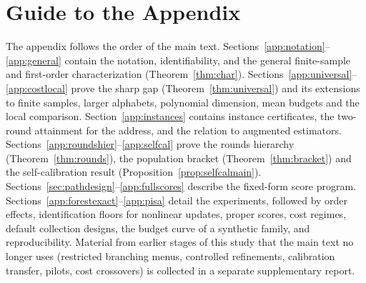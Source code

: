 \section*{Guide to the Appendix}
The appendix follows the order of the main text. Sections~\ref{app:notation}--\ref{app:general} contain the notation, identifiability, and the general finite-sample and first-order characterization (Theorem~\ref{thm:char}). Sections~\ref{app:universal}--\ref{app:costlocal} prove the sharp gap (Theorem~\ref{thm:universal}) and its extensions to finite samples, larger alphabets, polynomial dimension, mean budgets and the local comparison. Section~\ref{app:instances} contains instance certificates, the two-round attainment for the address, and the relation to augmented estimators. Sections~\ref{app:roundshier}--\ref{app:selfcal} prove the rounds hierarchy (Theorem~\ref{thm:rounds}), the population bracket (Theorem~\ref{thm:bracket}) and the self-calibration result (Proposition~\ref{prop:selfcalmain}). Sections~\ref{sec:pathdesign}--\ref{app:fullscores} describe the fixed-form score program. Sections~\ref{app:forestexact}--\ref{app:pisa} detail the experiments, followed by order effects, identification floors for nonlinear updates, proper scores, cost regimes, default collection designs, the budget curve of a synthetic family, and reproducibility. Material from earlier stages of this study that the main text no longer uses (restricted branching menus, controlled refinements, calibration transfer, pilots, cost crossovers) is collected in a separate supplementary report.

